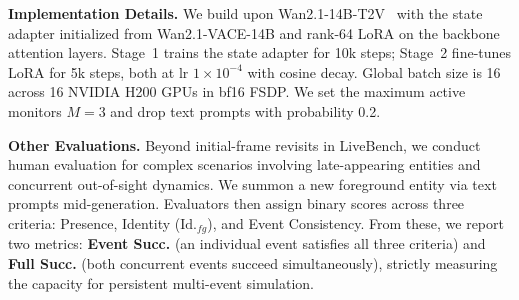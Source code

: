 \noindent
\textbf{Implementation Details.}
We build upon Wan2.1-14B-T2V~\cite{wan} with the state adapter initialized from Wan2.1-VACE-14B and rank-64 LoRA on the backbone attention layers. Stage~1 trains the state adapter for 10k steps; Stage~2 fine-tunes LoRA for 5k steps, both at lr $1\times10^{-4}$ with cosine decay. Global batch size is 16 across 16 NVIDIA H200 GPUs in bf16 FSDP. We set the maximum active monitors $M{=}3$ and drop text prompts with probability 0.2.

\noindent
\textbf{Other Evaluations.}
Beyond initial-frame revisits in LiveBench, we conduct human evaluation for complex scenarios involving late-appearing entities and concurrent out-of-sight dynamics. We summon a new foreground entity via text prompts mid-generation. Evaluators then assign binary scores across three criteria: Presence, Identity ($\text{Id.}_{fg}$), and Event Consistency. From these, we report two metrics: \textbf{Event Succ.} (an individual event satisfies all three criteria) and \textbf{Full Succ.} (both concurrent events succeed simultaneously), strictly measuring the capacity for persistent multi-event simulation.

